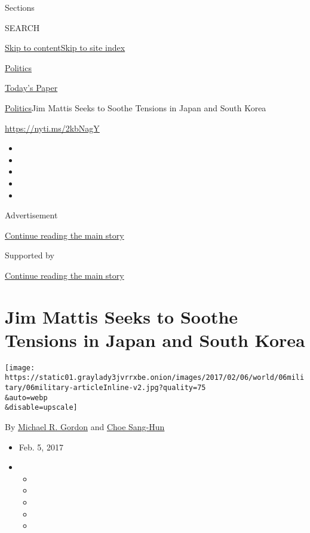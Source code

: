 Sections

SEARCH

\protect\hyperlink{site-content}{Skip to
content}\protect\hyperlink{site-index}{Skip to site index}

\href{https://www.nytimes3xbfgragh.onion/section/politics}{Politics}

\href{https://myaccount.nytimes3xbfgragh.onion/auth/login?response_type=cookie\&client_id=vi}{}

\href{https://www.nytimes3xbfgragh.onion/section/todayspaper}{Today's
Paper}

\href{/section/politics}{Politics}\textbar{}Jim Mattis Seeks to Soothe
Tensions in Japan and South Korea

\url{https://nyti.ms/2kbNagY}

\begin{itemize}
\item
\item
\item
\item
\item
\end{itemize}

Advertisement

\protect\hyperlink{after-top}{Continue reading the main story}

Supported by

\protect\hyperlink{after-sponsor}{Continue reading the main story}

\hypertarget{jim-mattis-seeks-to-soothe-tensions-in-japan-and-south-korea}{%
\section{Jim Mattis Seeks to Soothe Tensions in Japan and South
Korea}\label{jim-mattis-seeks-to-soothe-tensions-in-japan-and-south-korea}}

\texttt{[image: https://static01.graylady3jvrrxbe.onion/images/2017/02/06/world/06military/06military-articleInline-v2.jpg?quality=75\\\&auto=webp\\\&disable=upscale]}

By \href{http://www.nytimes3xbfgragh.onion/by/michael-r-gordon}{Michael
R. Gordon} and
\href{http://www.nytimes3xbfgragh.onion/by/choe-sang-hun}{Choe Sang-Hun}

\begin{itemize}
\item
  Feb. 5, 2017
\item
  \begin{itemize}
  \item
  \item
  \item
  \item
  \item
  \end{itemize}
\end{itemize}

